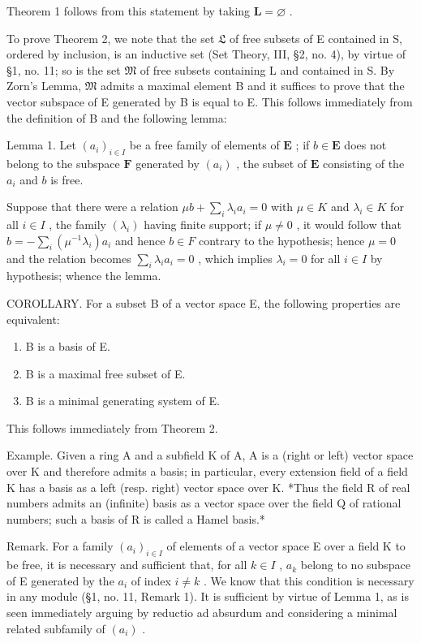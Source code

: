 Theorem 1 follows from this statement by taking \(\mathbf{L} = \varnothing\) .

To prove Theorem 2, we note that the set \(\mathfrak{L}\) of free subsets of E contained in S, ordered by inclusion, is an inductive set (Set Theory, III, §2, no. 4), by virtue of §1, no. 11; so is the set \(\mathfrak{M}\) of free subsets containing L and contained in S. By Zorn's Lemma, \(\mathfrak{M}\) admits a maximal element B and it suffices to prove that the vector subspace of E generated by B is equal to E. This follows immediately from the definition of B and the following lemma:

Lemma 1. Let \((a_{i})_{i\in I}\) be a free family of elements of \(\mathbf{E}\) ; if \(b\in \mathbf{E}\) does not belong to the subspace \(\mathbf{F}\) generated by \((a_{i})\) , the subset of \(\mathbf{E}\) consisting of the \(a_{i}\) and \(b\) is free.

Suppose that there were a relation \(\mu b + \sum_{i} \lambda_i a_i = 0\) with \(\mu \in K\) and \(\lambda_i \in K\) for all \(i \in I\) , the family \((\lambda_i)\) having finite support; if \(\mu \neq 0\) , it would follow that \(b = -\sum_{i} (\mu^{-1} \lambda_i) a_i\) and hence \(b \in F\) contrary to the hypothesis; hence \(\mu = 0\) and the relation becomes \(\sum_{i} \lambda_i a_i = 0\) , which implies \(\lambda_i = 0\) for all \(i \in I\) by hypothesis; whence the lemma.

COROLLARY. For a subset B of a vector space E, the following properties are equivalent:

\begin{enumerate}
\def\labelenumi{(\alph{enumi})}
\item
  B is a basis of E.
\item
  B is a maximal free subset of E.
\item
  B is a minimal generating system of E.
\end{enumerate}

This follows immediately from Theorem 2.

Example. Given a ring A and a subfield K of A, A is a (right or left) vector space over K and therefore admits a basis; in particular, every extension field of a field K has a basis as a left (resp. right) vector space over K. *Thus the field R of real numbers admits an (infinite) basis as a vector space over the field Q of rational numbers; such a basis of R is called a Hamel basis.*

Remark. For a family \((a_{i})_{i\in I}\) of elements of a vector space E over a field K to be free, it is necessary and sufficient that, for all \(k\in I\) , \(a_{k}\) belong to no subspace of E generated by the \(a_{i}\) of index \(i\neq k\) . We know that this condition is necessary in any module (§1, no. 11, Remark 1). It is sufficient by virtue of Lemma 1, as is seen immediately arguing by reductio ad absurdum and considering a minimal related subfamily of \((a_{i})\) .

